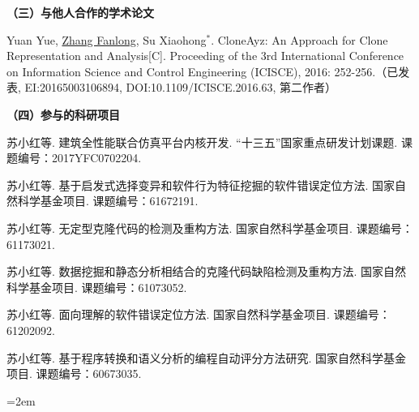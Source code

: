 \noindent\textbf{（三）与他人合作的学术论文}
\begin{publist}
\item
Yuan Yue, \underline{Zhang Fanlong},  Su Xiaohong{$^*$}. CloneAyz: An Approach for Clone Representation and Analysis[C]. Proceeding of the 3rd International Conference on Information Science and Control Engineering (ICISCE), 2016: 252-256.（已发表, EI:20165003106894, DOI:10.1109/ICISCE.2016.63, 第二作者）
\end{publist}

\noindent\textbf{（四）参与的科研项目}
\begin{publist}

\item
苏小红等. 建筑全性能联合仿真平台内核开发. “十三五”国家重点研发计划课题. 课题编号：2017YFC0702204.
\item	
苏小红等. 基于启发式选择变异和软件行为特征挖掘的软件错误定位方法. 国家自然科学基金项目. 课题编号：61672191.
\item	
苏小红等. 无定型克隆代码的检测及重构方法. 国家自然科学基金项目. 课题编号：61173021.
\item
苏小红等. 数据挖掘和静态分析相结合的克隆代码缺陷检测及重构方法. 国家自然科学基金项目. 课题编号：61073052.
\item
苏小红等. 面向理解的软件错误定位方法. 国家自然科学基金项目. 课题编号：61202092.

\item
苏小红等. 基于程序转换和语义分析的编程自动评分方法研究. 国家自然科学基金项目. 课题编号：60673035.

\end{publist}
\vfill
{}\hangindent=2em\noindent

\setlength{\parindent}{2em}
